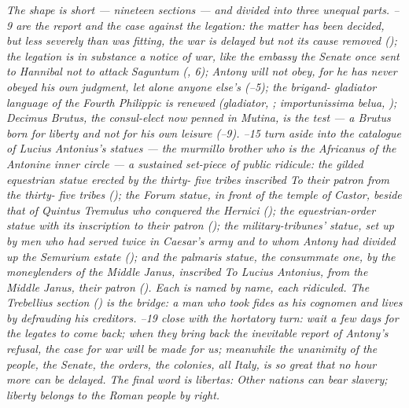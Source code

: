 \textit{The shape is short --- nineteen sections --- and divided
into three unequal parts. --9 are the report and
the case against the legation: the matter has been decided, but
\textit{less severely than was fitting}, the war is delayed but
not its cause removed (); the legation is in
substance a notice of war, like the embassy the Senate once
sent to Hannibal not to attack Saguntum (, 6);
Antony will not obey, for he has never obeyed his own judgment,
let alone anyone else's (--5); the brigand-
gladiator language of the Fourth Philippic is renewed
(\textit{gladiator}, ; \textit{importunissima
belua}, ); Decimus Brutus, the consul-elect now
penned in Mutina, is the test --- a Brutus born for liberty and
not for his own leisure (--9). --15
turn aside into the catalogue of Lucius Antonius's statues ---
the murmillo brother who is the \textit{Africanus} of the
Antonine inner circle --- a sustained set-piece of public
ridicule: the gilded equestrian statue erected by the thirty-
five tribes inscribed \textit{To their patron from the thirty-
five tribes} (); the Forum statue, in front of
the temple of Castor, beside that of Quintus Tremulus who
conquered the Hernici (); the equestrian-order
statue with its inscription \textit{to their patron}
(); the military-tribunes' statue, set up by men
who had served twice in Caesar's army and to whom Antony had
divided up the Semurium estate (); and the
\textit{palmaris} statue, the consummate one, by the
moneylenders of the Middle Janus, inscribed \textit{To Lucius
Antonius, from the Middle Janus, their patron} (). Each is named by name, each ridiculed. The Trebellius
section () is the bridge: a man who took
\textit{fides} as his cognomen and lives by defrauding his
creditors. --19 close with the hortatory turn:
wait a few days for the legates to come back; when they bring
back the inevitable report of Antony's refusal, the case for
war will be made for us; meanwhile the unanimity of the people,
the Senate, the orders, the colonies, all Italy, is so great
that no hour more can be delayed. The final word is
\textit{libertas}: \textit{Other nations can bear slavery;
liberty belongs to the Roman people by right.}}


